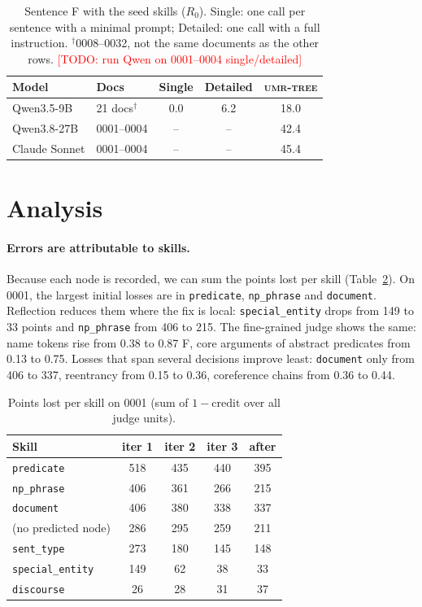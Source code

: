 \documentclass[11pt]{article}
\newcommand{\sys}{\textsc{umr-tree}\xspace}
\newcommand{\skill}[1]{\texttt{#1}}
\newcommand{\todo}[1]{\textcolor{red}{[TODO: #1]}}
\begin{document}
\begin{table}[t]
\centering\small
\setlength{\tabcolsep}{3.5pt}
\begin{tabular}{@{}llccc@{}}
\toprule
Model & Docs & Single & Detailed & \sys \\
\midrule
Qwen3.5-9B & 21 docs$^\dagger$ & 0.0 & 6.2 & 18.0 \\
Qwen3.8-27B & 0001--0004 & -- & -- & 42.4 \\
Claude Sonnet & 0001--0004 & -- & -- & 45.4 \\
\bottomrule
\end{tabular}
\caption{Sentence F with the seed skills ($R_0$). Single: one call per sentence with a minimal prompt; Detailed: one call with a full instruction. $^\dagger$0008--0032, not the same documents as the other rows. \todo{run Qwen on 0001--0004 single/detailed}}
\label{tab:small}
\end{table}

\section{Analysis}

\paragraph{Errors are attributable to skills.}
Because each node is recorded, we can sum the points lost per skill (Table~\ref{tab:lost}). On 0001, the largest initial losses are in \skill{predicate}, \skill{np\_phrase} and \skill{document}. Reflection reduces them where the fix is local: \skill{special\_entity} drops from 149 to 33 points and \skill{np\_phrase} from 406 to 215. The fine-grained judge shows the same: name tokens rise from 0.38 to 0.87 F, core arguments of abstract predicates from 0.13 to 0.75. Losses that span several decisions improve least: \skill{document} only from 406 to 337, reentrancy from 0.15 to 0.36, coreference chains from 0.36 to 0.44.

\begin{table}[t]
\centering\small
\setlength{\tabcolsep}{4pt}
\begin{tabular}{@{}lcccc@{}}
\toprule
Skill & iter 1 & iter 2 & iter 3 & after \\
\midrule
\skill{predicate} & 518 & 435 & 440 & 395 \\
\skill{np\_phrase} & 406 & 361 & 266 & 215 \\
\skill{document} & 406 & 380 & 338 & 337 \\
(no predicted node) & 286 & 295 & 259 & 211 \\
\skill{sent\_type} & 273 & 180 & 145 & 148 \\
\skill{special\_entity} & 149 & 62 & 38 & 33 \\
\skill{discourse} & 26 & 28 & 31 & 37 \\
\bottomrule
\end{tabular}
\caption{Points lost per skill on 0001 (sum of $1-\text{credit}$ over all judge units).}
\label{tab:lost}
\end{table}
\end{document}
